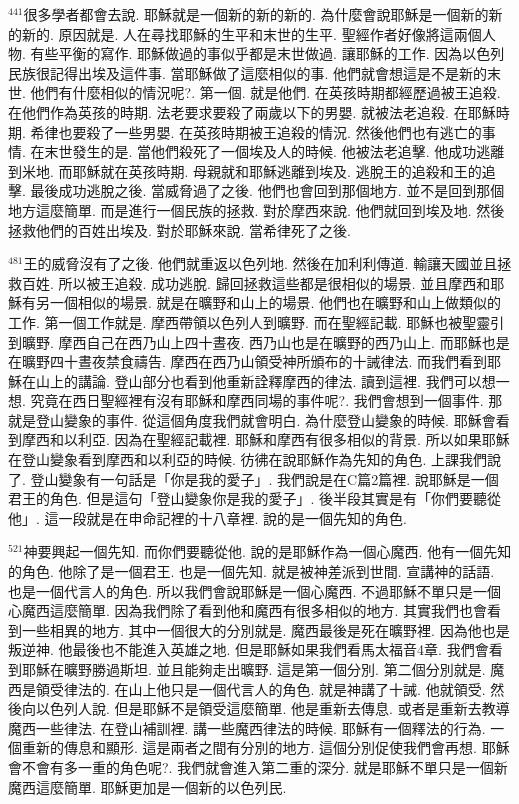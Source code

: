 \documentclass{book}
\begin{document}
$^{441}$很多學者都會去說.
耶穌就是一個新的新的新的.
為什麼會說耶穌是一個新的新的新的.
原因就是.
人在尋找耶穌的生平和末世的生平.
聖經作者好像將這兩個人物.
有些平衡的寫作.
耶穌做過的事似乎都是末世做過.
讓耶穌的工作.
因為以色列民族很記得出埃及這件事.
當耶穌做了這麼相似的事.
他們就會想這是不是新的末世.
他們有什麼相似的情況呢?.
第一個.
就是他們.
在英孩時期都經歷過被王追殺.
在他們作為英孩的時期.
法老要求要殺了兩歲以下的男嬰.
就被法老追殺.
在耶穌時期.
希律也要殺了一些男嬰.
在英孩時期被王追殺的情況.
然後他們也有逃亡的事情.
在末世發生的是.
當他們殺死了一個埃及人的時候.
他被法老追擊.
他成功逃離到米地.
而耶穌就在英孩時期.
母親就和耶穌逃離到埃及.
逃脫王的追殺和王的追擊.
最後成功逃脫之後.
當威脅過了之後.
他們也會回到那個地方.
並不是回到那個地方這麼簡單.
而是進行一個民族的拯救.
對於摩西來說.
他們就回到埃及地.
然後拯救他們的百姓出埃及.
對於耶穌來說.
當希律死了之後.

$^{481}$王的威脅沒有了之後.
他們就重返以色列地.
然後在加利利傳道.
輸讓天國並且拯救百姓.
所以被王追殺.
成功逃脫.
歸回拯救這些都是很相似的場景.
並且摩西和耶穌有另一個相似的場景.
就是在曠野和山上的場景.
他們也在曠野和山上做類似的工作.
第一個工作就是.
摩西帶領以色列人到曠野.
而在聖經記載.
耶穌也被聖靈引到曠野.
摩西自己在西乃山上四十晝夜.
西乃山也是在曠野的西乃山上.
而耶穌也是在曠野四十晝夜禁食禱告.
摩西在西乃山領受神所頒布的十誡律法.
而我們看到耶穌在山上的講論.
登山部分也看到他重新詮釋摩西的律法.
讀到這裡.
我們可以想一想.
究竟在西日聖經裡有沒有耶穌和摩西同場的事件呢?.
我們會想到一個事件.
那就是登山變象的事件.
從這個角度我們就會明白.
為什麼登山變象的時候.
耶穌會看到摩西和以利亞.
因為在聖經記載裡.
耶穌和摩西有很多相似的背景.
所以如果耶穌在登山變象看到摩西和以利亞的時候.
彷彿在說耶穌作為先知的角色.
上課我們說了.
登山變象有一句話是「你是我的愛子」.
我們說是在C篇2篇裡.
說耶穌是一個君王的角色.
但是這句「登山變象你是我的愛子」.
後半段其實是有「你們要聽從他」.
這一段就是在申命記裡的十八章裡.
說的是一個先知的角色.

$^{521}$神要興起一個先知.
而你們要聽從他.
說的是耶穌作為一個心魔西.
他有一個先知的角色.
他除了是一個君王.
也是一個先知.
就是被神差派到世間.
宣講神的話語.
也是一個代言人的角色.
所以我們會說耶穌是一個心魔西.
不過耶穌不單只是一個心魔西這麼簡單.
因為我們除了看到他和魔西有很多相似的地方.
其實我們也會看到一些相異的地方.
其中一個很大的分別就是.
魔西最後是死在曠野裡.
因為他也是叛逆神.
他最後也不能進入英雄之地.
但是耶穌如果我們看馬太福音4章.
我們會看到耶穌在曠野勝過斯坦.
並且能夠走出曠野.
這是第一個分別.
第二個分別就是.
魔西是領受律法的.
在山上他只是一個代言人的角色.
就是神講了十誡.
他就領受.
然後向以色列人說.
但是耶穌不是領受這麼簡單.
他是重新去傳息.
或者是重新去教導魔西一些律法.
在登山補訓裡.
講一些魔西律法的時候.
耶穌有一個釋法的行為.
一個重新的傳息和顯形.
這是兩者之間有分別的地方.
這個分別促使我們會再想.
耶穌會不會有多一重的角色呢?.
我們就會進入第二重的深分.
就是耶穌不單只是一個新魔西這麼簡單.
耶穌更加是一個新的以色列民.
\end{document}
